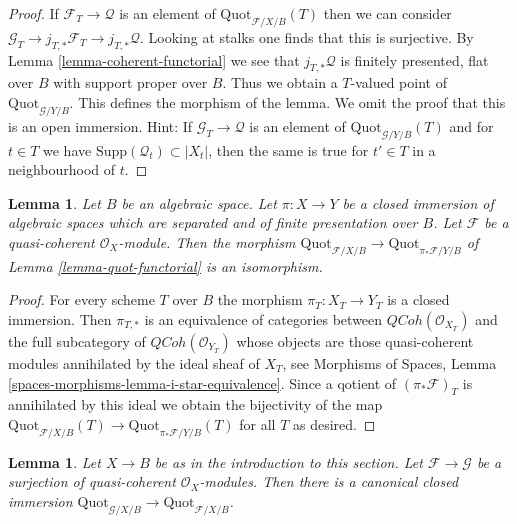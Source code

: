 \documentclass{stacks-project}
\theoremstyle{plain}
\newtheorem{lemma}[subsection]{Lemma}
\theoremstyle{definition}
\theoremstyle{remark}
\numberwithin{equation}{subsection}
\def\QCoh{\mathit{QCoh}}
\def\Quotfunctor{\mathrm{Quot}}
\begin{document}
\begin{proof}
If $\mathcal{F}_T \to \mathcal{Q}$ is an element of
$\Quotfunctor_{\mathcal{F}/X/B}(T)$ then we can consider
$\mathcal{G}_T \to j_{T, *}\mathcal{F}_T \to j_{T, *}\mathcal{Q}$.
Looking at stalks one finds that this is surjective.
By Lemma \ref{lemma-coherent-functorial}
we see that $j_{T, *}\mathcal{Q}$ is finitely presented, flat over $B$
with support proper over $B$. Thus we obtain a $T$-valued
point of $\Quotfunctor_{\mathcal{G}/Y/B}$.
This defines the morphism of the lemma.
We omit the proof that this is an open immersion. Hint:
If $\mathcal{G}_T \to \mathcal{Q}$ is an element of
$\Quotfunctor_{\mathcal{G}/Y/B}(T)$
and for $t \in T$ we have $\text{Supp}(\mathcal{Q}_t) \subset |X_t|$,
then the same is true for $t' \in T$ in a neighbourhood of $t$.
\end{proof}

\begin{lemma}
\label{lemma-quot-closed}
Let $B$ be an algebraic space. Let $\pi : X \to Y$ be a closed immersion
of algebraic spaces which are separated and of finite presentation over $B$.
Let $\mathcal{F}$ be a quasi-coherent $\mathcal{O}_X$-module.
Then the morphism
$\Quotfunctor_{\mathcal{F}/X/B} \to \Quotfunctor_{\pi_*\mathcal{F}/Y/B}$ of
Lemma \ref{lemma-quot-functorial} is an isomorphism.
\end{lemma}

\begin{proof}
For every scheme $T$ over $B$ the morphism $\pi_T : X_T \to Y_T$
is a closed immersion. Then $\pi_{T, *}$ is an equivalence of
categories between $\QCoh(\mathcal{O}_{X_T})$ and the full subcategory
of $\QCoh(\mathcal{O}_{Y_T})$ whose objects are those quasi-coherent
modules annihilated by the ideal sheaf of $X_T$, see
Morphisms of Spaces, Lemma \ref{spaces-morphisms-lemma-i-star-equivalence}.
Since a qotient of
$(\pi_*\mathcal{F})_T$ is annihilated by this ideal we obtain the
bijectivity of the map
$\Quotfunctor_{\mathcal{F}/X/B}(T) \to \Quotfunctor_{\pi_*\mathcal{F}/Y/B}(T)$
for all $T$ as desired.
\end{proof}

\begin{lemma}
\label{lemma-quot-quotient}
Let $X \to B$ be as in the introduction to this section. Let
$\mathcal{F} \to \mathcal{G}$ be a surjection of quasi-coherent
$\mathcal{O}_X$-modules. Then there is a canonical closed immersion
$\Quotfunctor_{\mathcal{G}/X/B} \to \Quotfunctor_{\mathcal{F}/X/B}$.
\end{lemma}
\end{document}

